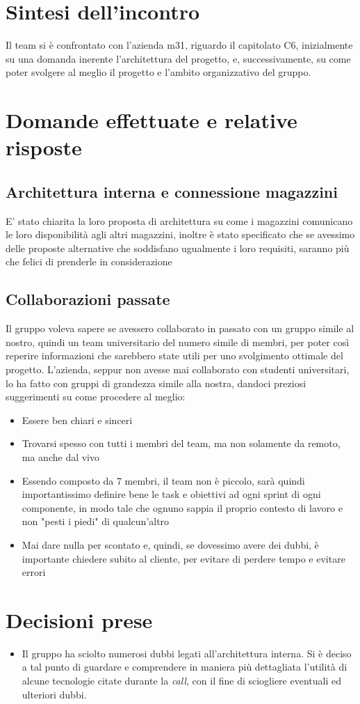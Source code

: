 \documentclass[italian, 12pt]{article}
\begin{document}
\section{Sintesi dell'incontro}
Il team si è confrontato con l'azienda m31, riguardo il capitolato C6, inizialmente su una domanda inerente l'architettura del progetto, e, successivamente, su come poter svolgere al meglio il progetto e l'ambito organizzativo del gruppo.


\section{Domande effettuate e relative risposte}
\subsection{Architettura interna e connessione magazzini}
E' stato chiarita la loro proposta di architettura su come i magazzini comunicano le loro disponibilità agli altri magazzini, inoltre è stato specificato che se avessimo delle proposte alternative che soddisfano ugualmente i loro requisiti, saranno più che felici di prenderle in considerazione

\subsection{Collaborazioni passate}
Il gruppo voleva sapere se avessero collaborato in passato con un gruppo simile al nostro, quindi un team universitario del numero simile di membri, per poter così reperire informazioni che sarebbero state utili per uno svolgimento ottimale del progetto. L'azienda, seppur non avesse mai collaborato con studenti universitari, lo ha fatto con gruppi di grandezza simile alla nostra, dandoci preziosi suggerimenti su come procedere al meglio:
\begin{itemize}
    \item Essere ben chiari e sinceri
    \item Trovarsi spesso con tutti i membri del team, ma non solamente da remoto, ma anche dal vivo
    \item Essendo composto da 7 membri, il team non è piccolo, sarà quindi importantissimo definire bene le task e obiettivi ad ogni sprint di ogni componente, in modo tale che ognuno sappia il proprio contesto di lavoro e non "pesti i piedi" di qualcun'altro
    \item Mai dare nulla per scontato e, quindi, se dovessimo avere dei dubbi, è importante chiedere subito al cliente, per evitare di perdere tempo e evitare errori
\end{itemize}

\section{Decisioni prese}
\begin{itemize}
    \item Il gruppo ha sciolto numerosi dubbi legati all'architettura interna. Si è deciso a tal punto di guardare e comprendere in maniera più dettagliata l'utilità di alcune tecnologie citate durante la \textit{call}, con il fine di sciogliere eventuali ed ulteriori dubbi.
\end{itemize}
\end{document}
